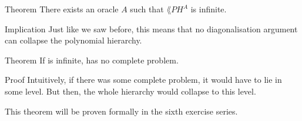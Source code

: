 \documentclass[a4paper]{article}
\begin{document}
\begin{parag}{Theorem}
    There exists an oracle $A$ such that $\lang{PH}^{A}$ is infinite.

    \begin{subparag}{Implication}
        Just like we saw before, this means that no diagonalisation argument can collapse the polynomial hierarchy.
    \end{subparag}
\end{parag}

\begin{parag}{Theorem}
    If  is infinite,  has no complete problem.
    
    \begin{subparag}{Proof}
        Intuitively, if there was some complete problem, it would have to lie in some level. But then, the whole hierarchy would collapse to this level.

        This theorem will be proven formally in the sixth exercise series.
    \end{subparag}
\end{parag}
\end{document}
